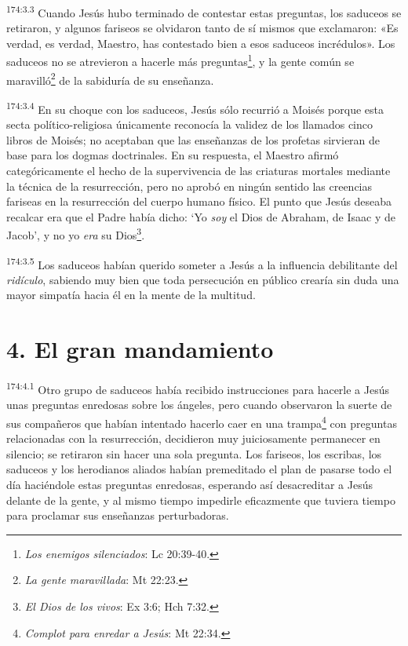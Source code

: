 \par 
\textsuperscript{174:3.3} Cuando Jesús hubo terminado de contestar estas preguntas, los saduceos se retiraron, y algunos fariseos se olvidaron tanto de sí mismos que exclamaron: «Es verdad, es verdad, Maestro, has contestado bien a esos saduceos incrédulos». Los saduceos no se atrevieron a hacerle más preguntas\footnote{\textit{Los enemigos silenciados}: Lc 20:39-40.}, y la gente común se maravilló\footnote{\textit{La gente maravillada}: Mt 22:23.} de la sabiduría de su enseñanza.

\par 
\textsuperscript{174:3.4} En su choque con los saduceos, Jesús sólo recurrió a Moisés porque esta secta político-religiosa únicamente reconocía la validez de los llamados cinco libros de Moisés; no aceptaban que las enseñanzas de los profetas sirvieran de base para los dogmas doctrinales. En su respuesta, el Maestro afirmó categóricamente el hecho de la supervivencia de las criaturas mortales mediante la técnica de la resurrección, pero no aprobó en ningún sentido las creencias fariseas en la resurrección del cuerpo humano físico. El punto que Jesús deseaba recalcar era que el Padre había dicho: `Yo \textit{soy} el Dios de Abraham, de Isaac y de Jacob', y no yo \textit{era} su Dios\footnote{\textit{El Dios de los vivos}: Ex 3:6; Hch 7:32.}.

\par 
\textsuperscript{174:3.5} Los saduceos habían querido someter a Jesús a la influencia debilitante del \textit{ridículo}, sabiendo muy bien que toda persecución en público crearía sin duda una mayor simpatía hacia él en la mente de la multitud.

\section*{4. El gran mandamiento}
\par 
\textsuperscript{174:4.1} Otro grupo de saduceos había recibido instrucciones para hacerle a Jesús unas preguntas enredosas sobre los ángeles, pero cuando observaron la suerte de sus compañeros que habían intentado hacerlo caer en una trampa\footnote{\textit{Complot para enredar a Jesús}: Mt 22:34.} con preguntas relacionadas con la resurrección, decidieron muy juiciosamente permanecer en silencio; se retiraron sin hacer una sola pregunta. Los fariseos, los escribas, los saduceos y los herodianos aliados habían premeditado el plan de pasarse todo el día haciéndole estas preguntas enredosas, esperando así desacreditar a Jesús delante de la gente, y al mismo tiempo impedirle eficazmente que tuviera tiempo para proclamar sus enseñanzas perturbadoras.

